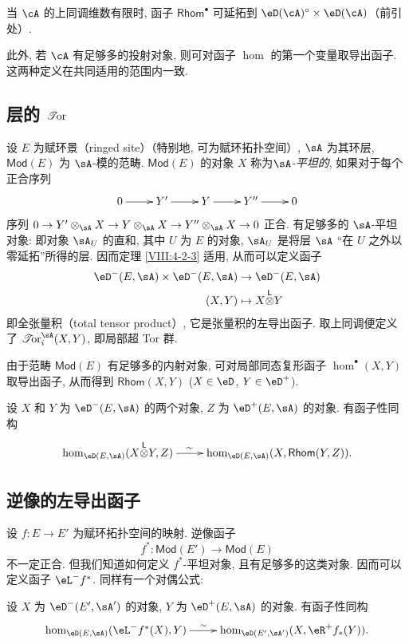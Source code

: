 当 $\cA$ 的上同调维数有限时, 函子 $\mathsf{Rhom}^\bullet$ 可延拓到 $\eD(\cA)^\circ\times \eD(\cA)$（前引处）.

此外, 若 $\cA$ 有足够多的投射对象, 则可对函子 $\hom$ 的第一个变量取导出函子. 这两种定义在共同适用的范围内一致.

\subsection{层的 \texorpdfstring{$\operatorname{\mathscr{T}\!or}$}{Tor}}\label{VIII:6-2}

设 $E$ 为赋环景（ringed site）（特别地, 可为赋环拓扑空间）, $\sA$ 为其环层, $\mathsf{Mod}(E)$ 为 $\sA$-模的范畴. $\mathsf{Mod}(E)$ 的对象 $X$ 称为\emph{$\sA$-平坦的}, 如果对于每个正合序列
\[\xymatrix{
  0 \ar[r]
    & Y' \ar[r]
    & Y \ar[r]
    & Y'' \ar[r]
    & 0
}\]
序列
$0 \to Y'\otimes_\sA X \to Y\otimes_\sA X \to Y''\otimes_\sA X\to 0$
正合. 有足够多的 $\sA$-平坦对象: 即对象 $\sA_U$ 的直和, 其中 $U$ 为 $E$ 的对象, $\sA_U$ 是将层 $\sA$ “在 $U$ 之外以零延拓”所得的层. 因而定理 \ref{VIII:4-2-3} 适用, 从而可以定义函子
\begin{align*}
  \eD^-(E,\sA) \times \eD^-(E,\sA) &\to \eD^-(E,\sA) \\
  (X,Y) &\mapsto X\lotimes Y
\end{align*}
即全张量积（total tensor product）, 它是张量积的左导出函子. 取上同调便定义了 $\Tor_i^\sA(X,Y)$, 即局部超 Tor 群.

由于范畴 $\mathsf{Mod}(E)$ 有足够多的内射对象, 可对局部同态复形函子 $\hom^\bullet(X,Y)$ 取导出函子, 从而得到 $\mathsf{Rhom}(X,Y)$ ($X\in \eD$, $Y\in \eD^+$).

设 $X$ 和 $Y$ 为 $\eD^-(E,\sA)$ 的两个对象, $Z$ 为 $\eD^+(E,\sA)$ 的对象. 有函子性同构
\[\xymatrix{
  \hom_{\eD(E,\sA)}(X\lotimes Y,Z) \ar[r]^-\sim
    &\hom_{\eD(E,\sA)}(X,\mathsf{Rhom}(Y,Z)) \text{.}
}\]

\subsection{逆像的左导出函子}\label{VIII:6-3}

设 $f:E\to E'$ 为赋环拓扑空间的映射. 逆像函子
\[
  f^\ast:\mathsf{Mod}(E') \to \mathsf{Mod}(E)
\]
不一定正合. 但我们知道如何定义 $f^\ast$-平坦对象, 且有足够多的这类对象. 因而可以定义函子 $\eL^- f^\ast$. 同样有一个对偶公式:

设 $X$ 为 $\eD^-(E',\sA')$ 的对象, $Y$ 为 $\eD^+(E,\sA)$ 的对象. 有函子性同构
\[\xymatrix{
  \hom_{\eD(E,\sA)}(\eL^- f^\ast(X),Y) \ar[r]^-\sim
    & \hom_{\eD(E',\sA')}(X,\eR^+ f_\ast(Y)) \text{.}
}\]

\endgroup
